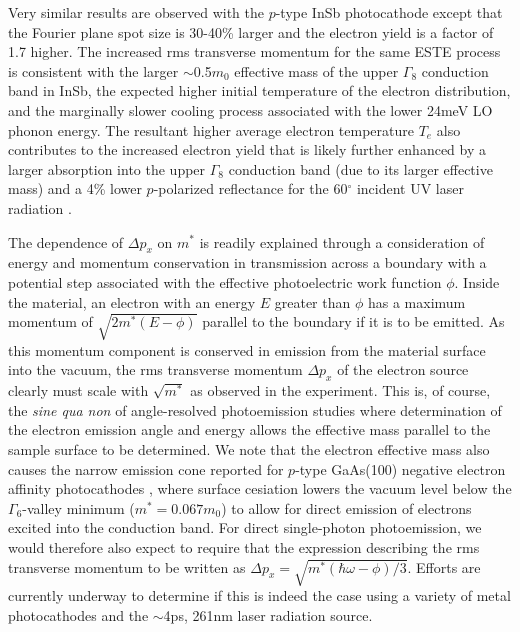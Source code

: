 Very similar results are observed with the $p$-type InSb photocathode except that the Fourier plane spot size is 30-40\%  larger and the electron yield is a factor of 1.7 higher.
The increased rms transverse momentum for the same ESTE process is consistent with the larger $\sim$0.5$m_0$ effective mass of the upper $\Gamma_8$ conduction band in InSb, the expected higher initial temperature of the electron distribution, and the marginally slower cooling process associated with the lower 24meV LO phonon energy.
The resultant higher average electron temperature $T_e$ also contributes to the increased electron yield that is likely further enhanced by a larger absorption into the upper $\Gamma_8$ conduction band (due to its larger effective mass) and a 4\% lower $p$-polarized reflectance for the 60$^{\circ}$ incident UV laser radiation \cite{aspnes_dielectric_1983}. 

The dependence of $\Delta p_x$ on $m^*$ is readily explained through a consideration of energy and momentum conservation in transmission across a boundary with a potential step associated with the effective photoelectric work function $\phi$.
Inside the material, an electron with an energy $E$ greater than $\phi$ has a maximum momentum of $\sqrt{2 m^* (E-\phi) }$ parallel to the boundary if it is to be emitted.
As this momentum component is conserved in emission from the material surface into the vacuum, the rms transverse momentum $\Delta p_x$ of the electron source clearly must scale with $\sqrt{m^*}$ as observed in the experiment.
This is, of course, the \textit{sine qua non} of angle-resolved photoemission studies \cite{himpsel_angle-resolved_1983} where determination of the electron emission angle and energy allows the effective mass parallel to the sample surface to be determined.
We note that the electron effective mass also causes the narrow emission cone reported for $p$-type GaAs(100) negative electron affinity photocathodes \cite{liu_narrow_2005}, where surface cesiation lowers the vacuum level below the $\Gamma_6$-valley minimum ($m^* = 0.067m_0$)  to allow for direct emission of electrons excited into the conduction band.
For direct single-photon photoemission, we would therefore also expect to require that the expression describing the rms transverse momentum to be written as $\Delta p_x = \sqrt{m^* ( \hbar \omega - \phi ) / 3 }$.
Efforts are currently underway to determine if this is indeed the case using a variety of metal photocathodes and the $\sim$4ps, 261nm laser radiation source. 
